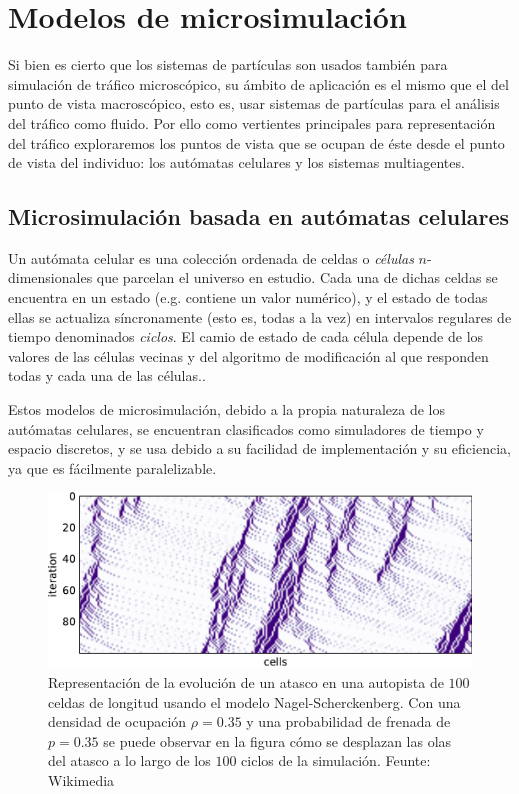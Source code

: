 \section{Modelos de microsimulación}

Si bien es cierto que los sistemas de partículas son usados también para simulación de tráfico microscópico, su ámbito de aplicación es el mismo que el del punto de vista macroscópico, esto es, usar sistemas de partículas para el análisis del tráfico como fluido. Por ello como vertientes principales para representación del tráfico exploraremos los puntos de vista que se ocupan de éste desde el punto de vista del individuo: los autómatas celulares y los sistemas multiagentes.

\subsection{Microsimulación basada en autómatas celulares}

Un autómata celular es una colección ordenada de celdas o \textit{células} $n$-dimensionales que parcelan el universo en estudio. Cada una de dichas celdas se encuentra en un estado (e.g. contiene un valor numérico), y el estado de todas ellas se actualiza síncronamente (esto es, todas a la vez) en intervalos regulares de tiempo denominados \textit{ciclos}. El camio de estado de cada célula depende de los valores de las células vecinas y del algoritmo de modificación al que responden todas y cada una de las células..

Estos modelos de microsimulación, debido a la propia naturaleza de los autómatas celulares, se encuentran clasificados como simuladores de tiempo y espacio discretos, y se usa debido a su facilidad de implementación y su eficiencia, ya que es fácilmente paralelizable.


\begin{figure}
	\centering
	\includegraphics[width=.75\linewidth]{images/nagel-schreck}
	\caption{Representación de la evolución de un atasco en una autopista  de $100$ celdas de longitud usando el modelo Nagel-Scherckenberg. Con una densidad de ocupación $\rho = 0.35$ y una probabilidad de frenada de $p = 0.35$ se puede observar en la figura cómo se desplazan las olas del atasco a lo largo de los $100$ ciclos de la simulación. Feunte: Wikimedia}
	\label{fig:nagel-schreck}
\end{figure}

